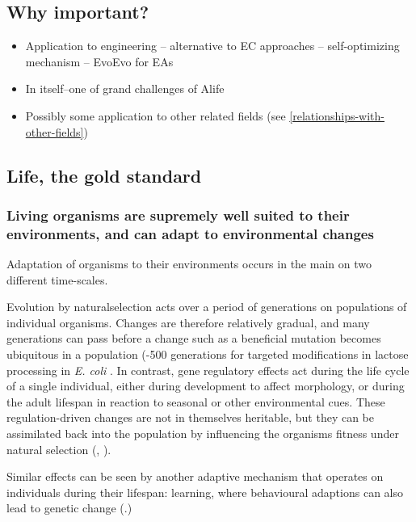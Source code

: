 \subsection{Why important?}\label{why-important}

\begin{itemize}
	\item Application to engineering -- alternative to EC approaches -- self-optimizing mechanism -- EvoEvo for EAs
	\item In itself--one of grand challenges of Alife \autocite{Bedau:2000mi}
	\item Possibly some application to other related fields (see \cref{relationships-with-other-fields})
\end{itemize}

\subsection{Life, the gold standard}

\subsubsection{Living organisms are supremely well suited to their environments, and can adapt to environmental changes}
\label{living-organisms-are-supremely-well-suited-to-their-environments-and-can-adapt-to-environmental-changes}

Adaptation of organisms to their environments occurs in the main on two
different time-scales.

Evolution by \gls{naturalselection} acts over a period of generations on
populations of individual organisms. Changes are therefore relatively
gradual, and many generations can pass before a change such as a
beneficial mutation becomes ubiquitous in a population (-500
generations for targeted modifications in lactose processing in
\emph{E. coli} \autocite{Dekel:2005fk}. In contrast, gene regulatory
effects act during the life cycle of a single individual, either during
development to affect morphology, or during the adult lifespan in
reaction to seasonal or other environmental cues. These
regulation-driven changes are not in themselves heritable, but they can
be assimilated back into the population by influencing the organisms
fitness under natural selection (\eg,
\autocite{Baldwin:1896ly,Dennett:2003ve,Paenke:2009xe,Paenke:2007ve}).

Similar effects can be seen by another adaptive mechanism that operates
on individuals during their lifespan: learning, where behavioural
adaptions can also lead to genetic change
(\eg \autocite{Hinton:1987vy}.)


